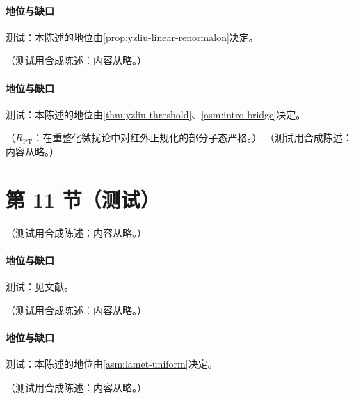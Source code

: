 \paragraph{地位与缺口}测试：本陈述的地位由\cref{prop:yzliu-linear-renormalon}决定。

\begin{conjecture}\label{conj:yzliu-threshold-hadronic}
（测试用合成陈述：内容从略。）
\end{conjecture}
\paragraph{地位与缺口}测试：本陈述的地位由\cref{thm:yzliu-threshold}、\cref{asm:intro-bridge}决定。

\begin{proposition}[准 GPD 单圈匹配核在 $x=\pm\xi$ 附近的结构 \tagR]\label{prop:yzliu-gpd-oneloop}
（$R_{\mathrm{PT}}$：在重整化微扰论中对红外正规化的部分子态严格。）
（测试用合成陈述：内容从略。）
\end{proposition}

\section{第 11 节（测试）}\label{sec:yzliu-models}

\begin{conjecture}[GPD 在 $x=\pm\xi$ 附近的 LaMET 可计算性 \tagC]\label{conj:yzliu-gpd-xi}
（测试用合成陈述：内容从略。）
\end{conjecture}
\paragraph{地位与缺口}测试：见文献。

\begin{theorem}\label{thm:yzliu-gn-convergence}
（测试用合成陈述：内容从略。）
\end{theorem}
\paragraph{地位与缺口}测试：本陈述的地位由\cref{asm:lamet-uniform}决定。

\begin{proposition}\label{prop:yzliu-gn-structure}
（测试用合成陈述：内容从略。）
\end{proposition}
